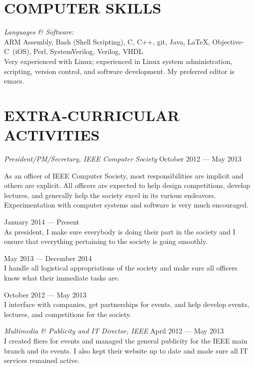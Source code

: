 \documentclass[margin]{res}
\begin{document}
\begin{resume}
  \section{COMPUTER SKILLS} 
  {\sl Languages \& Software:} \\
  ARM Assembly, Bash (Shell Scripting), C, C++, git, Java, \LaTeX,
  \mbox{Objective-C (iOS)}, Perl, SystemVerilog, Verilog, VHDL
  \vspace{0.5em}\\
  Very experienced with Linux; experienced in Linux system
  administration, scripting, version control, and software
  development. My preferred editor is emacs.

  \section{EXTRA-CURRICULAR ACTIVITIES}             
  {\sl President/PM/Secretary, IEEE Computer Society}
  \hfill October 2012 --- May 2013 \\
  \vspace{-0.75em}
  \begin{adjustwidth}{1.5em}{0pt}
    As an officer of IEEE Computer Society, most responsibilities are
    implicit and others are explicit. All officers are expected to
    help design competitions, develop lectures, and generally help the
    society excel in its various endeavors. Experimentation with
    computer systems and software is very much encouraged.
      \begin{description}[leftmargin=1.5em] 
      \item [President] \hfill January 2014 --- Present \\
        As president, I make sure everybody is doing their part in the
        society and I ensure that everything pertaining to the society is
        going smoothly.
      \item [Secretary] \hfill May 2013 --- December 2014 \\
        I handle all logistical appropriations of the society and make
        sure all officers know what their immediate tasks are.
      \item [Project Manager] \hfill October 2012 --- May 2013 \\
        I interface with companies, get partnerships for events, and
        help develop events, lectures, and competitions for the
        society.
    \end{description}     
  \end{adjustwidth}
  {\sl Multimedia \& Publicity and IT Director, IEEE}
  \hfill April 2012 --- May 2013 \\
  I created fliers for events and managed the general publicity for
  the IEEE main branch and its events. I also kept their website up to
  date and made sure all IT services remained active.
\end{resume}
\end{document}
